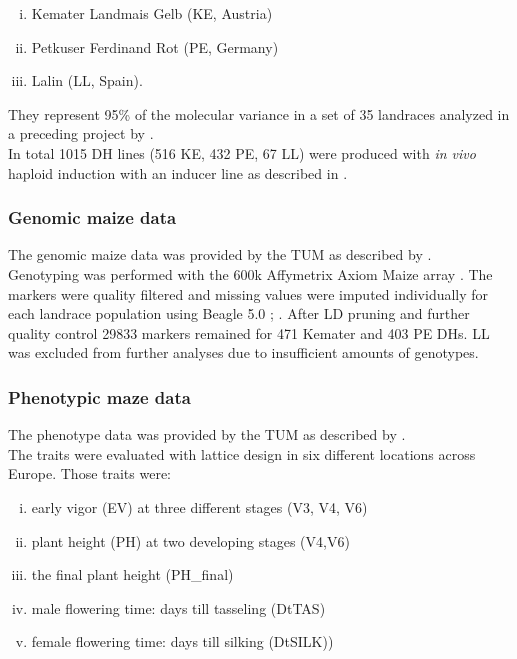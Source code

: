 \begin{enumerate}[(i)]
\item Kemater Landmais Gelb (KE, Austria)
\item Petkuser Ferdinand Rot (PE, Germany)
\item Lalin (LL, Spain).
\end{enumerate}

They represent 95\% of the molecular variance in a set of
35 landraces analyzed in a preceding project by \cite{mayer2017there}.\\
In total 1015 DH lines (516 KE, 432 PE, 67 LL) were produced with \textit{in vivo} haploid
induction with an inducer line as described in \cite{roeber2005vivo}.


\subsubsection{Genomic maize data}
The genomic maize data was provided by the TUM as described by \cite{holker2019european}.\\
Genotyping was performed with the 600k Affymetrix\textsuperscript{\textregistered}
Axiom\textsuperscript{\textregistered} Maize array \cite{unterseer2014powerful}. The
markers were quality filtered and missing values were imputed individually for each
landrace population using Beagle 5.0 \cite{browning2007rapid};
\cite{browning2018one}. After LD pruning and further quality control 29833 markers
remained for 471 Kemater and 403 PE DHs. LL was excluded from further analyses due to
insufficient amounts of genotypes.

\subsubsection{Phenotypic maze data}
The phenotype data was provided by the TUM as described by \cite{holker2019european}. \\
The traits were evaluated with lattice design in six different locations across
Europe. Those traits were:

\begin{enumerate}[(i)]
\item early vigor (EV) at three different stages (V3, V4, V6)
\item plant height (PH) at two developing stages (V4,V6)
\item the final plant height (PH\_final)
\item male flowering time: days till tasseling (DtTAS)
\item female flowering time: days till silking (DtSILK)) 
\end{enumerate}

